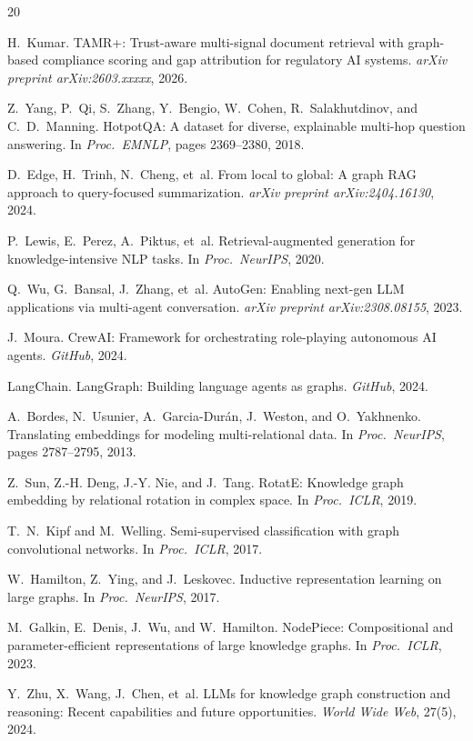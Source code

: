 \documentclass[a4paper,11pt]{article}
\theoremstyle{definition}
\begin{document}
\begingroup
\small
\begin{thebibliography}{20}

H.~Kumar.
\newblock TAMR+: Trust-aware multi-signal document retrieval with graph-based compliance scoring and gap attribution for regulatory AI systems.
\newblock \textit{arXiv preprint arXiv:2603.xxxxx}, 2026.

Z.~Yang, P.~Qi, S.~Zhang, Y.~Bengio, W.~Cohen, R.~Salakhutdinov, and C.~D.~Manning.
\newblock HotpotQA: A dataset for diverse, explainable multi-hop question answering.
\newblock In \textit{Proc.\ EMNLP}, pages 2369--2380, 2018.

D.~Edge, H.~Trinh, N.~Cheng, et~al.
\newblock From local to global: A graph RAG approach to query-focused summarization.
\newblock \textit{arXiv preprint arXiv:2404.16130}, 2024.

P.~Lewis, E.~Perez, A.~Piktus, et~al.
\newblock Retrieval-augmented generation for knowledge-intensive NLP tasks.
\newblock In \textit{Proc.\ NeurIPS}, 2020.

Q.~Wu, G.~Bansal, J.~Zhang, et~al.
\newblock AutoGen: Enabling next-gen LLM applications via multi-agent conversation.
\newblock \textit{arXiv preprint arXiv:2308.08155}, 2023.

J.~Moura.
\newblock CrewAI: Framework for orchestrating role-playing autonomous AI agents.
\newblock \textit{GitHub}, 2024.

LangChain.
\newblock LangGraph: Building language agents as graphs.
\newblock \textit{GitHub}, 2024.

A.~Bordes, N.~Usunier, A.~Garcia-Dur\'{a}n, J.~Weston, and O.~Yakhnenko.
\newblock Translating embeddings for modeling multi-relational data.
\newblock In \textit{Proc.\ NeurIPS}, pages 2787--2795, 2013.

Z.~Sun, Z.-H. Deng, J.-Y. Nie, and J.~Tang.
\newblock RotatE: Knowledge graph embedding by relational rotation in complex space.
\newblock In \textit{Proc.\ ICLR}, 2019.

T.~N.~Kipf and M.~Welling.
\newblock Semi-supervised classification with graph convolutional networks.
\newblock In \textit{Proc.\ ICLR}, 2017.

W.~Hamilton, Z.~Ying, and J.~Leskovec.
\newblock Inductive representation learning on large graphs.
\newblock In \textit{Proc.\ NeurIPS}, 2017.

M.~Galkin, E.~Denis, J.~Wu, and W.~Hamilton.
\newblock NodePiece: Compositional and parameter-efficient representations of large knowledge graphs.
\newblock In \textit{Proc.\ ICLR}, 2023.

Y.~Zhu, X.~Wang, J.~Chen, et~al.
\newblock LLMs for knowledge graph construction and reasoning: Recent capabilities and future opportunities.
\newblock \textit{World Wide Web}, 27(5), 2024.

\end{thebibliography}
\endgroup
\end{document}
